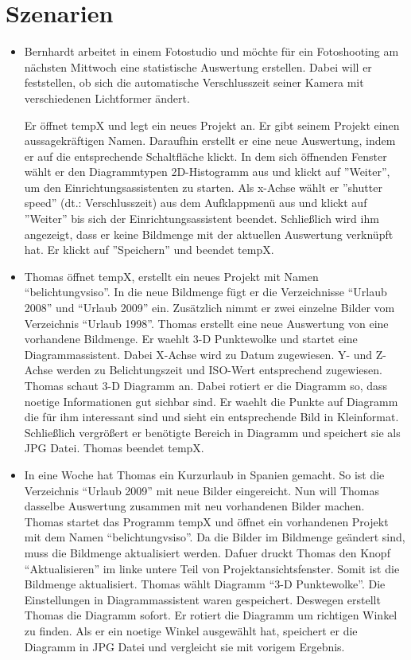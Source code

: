 \section{Szenarien}

\begin{itemize}
	\item Bernhardt arbeitet in einem Fotostudio und möchte für ein Fotoshooting am nächsten Mittwoch eine statistische Auswertung erstellen. Dabei will er feststellen, ob sich die automatische Verschlusszeit seiner Kamera mit verschiedenen \gls{Lichtformer} ändert.
	
Er öffnet \gls{tempX} und legt ein neues Projekt an. Er gibt seinem Projekt einen aussagekräftigen Namen.  Daraufhin erstellt er eine neue Auswertung, indem er auf die entsprechende Schaltfläche klickt. In dem sich öffnenden Fenster wählt er den Diagrammtypen 2D-Histogramm aus und klickt auf ''Weiter'', um den Einrichtungsassistenten zu starten. Als x-Achse wählt er ''shutter speed'' (dt.: Verschlusszeit) aus dem Aufklappmenü aus und klickt auf ''Weiter'' bis sich der Einrichtungsassistent beendet. Schließlich wird ihm angezeigt, dass er keine Bildmenge mit der aktuellen Auswertung verknüpft hat. Er klickt auf ''Speichern'' und beendet \gls{tempX}. 

	\item Thomas öffnet \gls{tempX}, erstellt ein neues Projekt mit Namen "`belichtungvsiso"'. In die neue Bildmenge fügt er die Verzeichnisse "`Urlaub 2008"' und "`Urlaub 2009"' ein. Zusätzlich nimmt er zwei einzelne Bilder vom Verzeichnis "`Urlaub 1998"'. Thomas erstellt eine neue Auswertung von eine vorhandene Bildmenge. Er waehlt 3-D Punktewolke und startet eine Diagrammassistent. Dabei X-Achse wird zu Datum zugewiesen. Y- und Z-Achse werden zu Belichtungszeit und ISO-Wert entsprechend zugewiesen. Thomas schaut 3-D Diagramm an. Dabei rotiert er die Diagramm so, dass noetige Informationen gut sichbar sind. Er waehlt die Punkte auf Diagramm die für ihm interessant sind und sieht ein entsprechende Bild in Kleinformat. Schließlich vergrößert er benötigte Bereich in Diagramm und speichert sie als JPG Datei. Thomas beendet \gls{tempX}. 

\item In eine Woche hat Thomas ein Kurzurlaub in Spanien gemacht. So ist die Verzeichnis "`Urlaub 2009"' mit neue Bilder eingereicht. Nun will Thomas dasselbe Auswertung zusammen mit neu vorhandenen Bilder machen. Thomas startet das Programm \gls{tempX} und öffnet ein vorhandenen Projekt mit dem Namen "`belichtungvsiso"'. Da die Bilder im Bildmenge geändert sind, muss die Bildmenge aktualisiert werden. Dafuer druckt Thomas den Knopf "`Aktualisieren"' im linke untere Teil von Projektansichtsfenster.  Somit ist die Bildmenge aktualisiert. Thomas wählt Diagramm "`3-D Punktewolke"'. Die Einstellungen in Diagrammassistent waren gespeichert. Deswegen erstellt Thomas die Diagramm sofort. Er rotiert die Diagramm um richtigen Winkel zu finden. Als er ein noetige Winkel ausgewählt hat, speichert er die Diagramm in JPG Datei und vergleicht sie mit vorigem Ergebnis. 
\end{itemize}